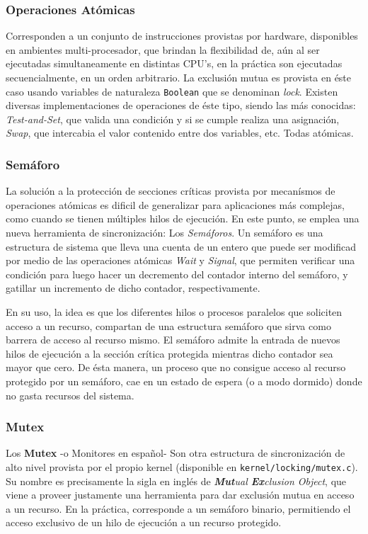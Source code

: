 \subsubsection{Operaciones Atómicas}
Corresponden a un conjunto de instrucciones provistas por hardware, disponibles en ambientes multi-procesador, que brindan la flexibilidad de, aún al ser ejecutadas simultaneamente en distintas CPU's, en la práctica son ejecutadas secuencialmente, en un orden arbitrario. La exclusión mutua es provista en éste caso usando variables de naturaleza \verb=Boolean= que se denominan \emph{lock}. Existen diversas implementaciones de operaciones de éste tipo, siendo las más conocidas: \emph{Test-and-Set}, que valida una condición y si se cumple realiza una asignación, \emph{Swap}, que intercabia el valor contenido entre dos variables, etc. Todas atómicas.

\subsubsection{Semáforo}
La solución a la protección de secciones críticas provista por mecanísmos de operaciones atómicas es dificil de generalizar para aplicaciones más complejas, como cuando se tienen múltiples hilos de ejecución. En este punto, se emplea una nueva herramienta de sincronización: Los \emph{Semáforos}. Un semáforo es una estructura de sistema que lleva una cuenta de un entero que puede ser modificad por medio de las operaciones atómicas \emph{Wait} y \emph{Signal}, que permiten verificar una condición para luego hacer un decremento del contador interno del semáforo, y gatillar un incremento de dicho contador, respectivamente.

En su uso, la idea es que los diferentes hilos o procesos paralelos que soliciten acceso a un recurso, compartan de una estructura semáforo que sirva como barrera de acceso al recurso mismo. El semáforo admite la entrada de nuevos hilos de ejecución a la sección crítica protegida mientras dicho contador sea mayor que cero. De ésta manera, un proceso que no consigue acceso al recurso protegido por un semáforo, cae en un estado de espera (o a modo dormido) donde no gasta recursos del sistema.

\subsubsection{Mutex}
Los \textbf{Mutex} -o Monitores en español- Son otra estructura de sincronización de alto nivel provista por el propio kernel (disponible en \verb=kernel/locking/mutex.c=). Su nombre es precisamente la sigla en inglés de \emph{\textbf{Mut}ual \textbf{Ex}clusion Object}, que viene a proveer justamente una herramienta para dar exclusión mutua en acceso a un recurso. En la práctica, corresponde a un semáforo binario, permitiendo el acceso exclusivo de un hilo de ejecución a un recurso protegido.

